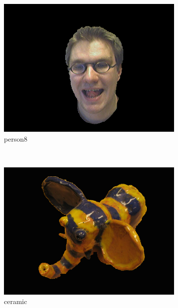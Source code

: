 \documentclass[10pt,twocolumn,letterpaper]{article}
\begin{document}
\begin{figure}[t]
\begin{subfigure}[b]{0.15\textwidth}
                \includegraphics[width=\textwidth]{figures/segmentations/person8.png}
                \caption{person8}
        \end{subfigure}%
        ~
        \begin{subfigure}[b]{0.15\textwidth}
                \includegraphics[width=\textwidth]{figures/UI_segmentation/ceramic.png}
                \caption{ceramic}
        \end{subfigure}%
        ~
        \begin{subfigure}[b]{0.15\textwidth}

\end{subfigure}
\end{figure}
\end{document}
